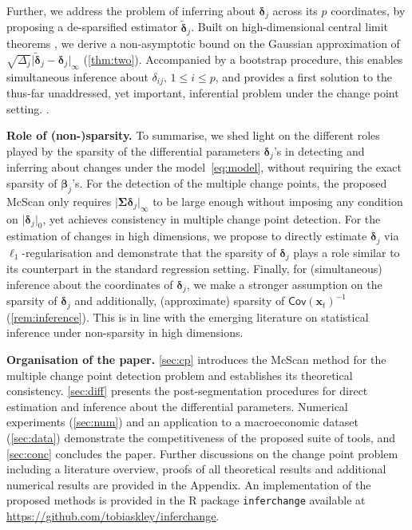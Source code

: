 \documentclass[11pt, a4paper]{article}
\newcommand{\mbf}{\mathbf}
\def\wc{\widetilde}
\newcommand{\Cov}[0]{\mathsf{Cov}}
\theoremstyle{definition}
\theoremstyle{definition}
\theoremstyle{definition}
\theoremstyle{definition}
\theoremstyle{definition}
\theoremstyle{remark}
\theoremstyle{definition}
\theoremstyle{definition}
\theoremstyle{definition}
\begin{document}
Further, we address the problem of inferring about $\bm\delta_j$ across its $p$ coordinates, by proposing a de-sparsified estimator $\wc{\bm\delta}_j$. Built on high-dimensional central limit theorems \citep{CCK23}, we derive a non-asymptotic bound on the Gaussian approximation of $\sqrt{\Delta_j} \vert \wc{\bm\delta}_j - \bm\delta_j \vert_\infty$ (\cref{thm:two}).
Accompanied by a bootstrap procedure, this enables simultaneous inference about $\delta_{ij}, \, 1 \le i \le p$, 
and provides a first solution to the thus-far unaddressed, yet important, inferential problem under the change point setting. . 

\smallskip
\textbf{Role of (non-)sparsity.} To summarise, we shed light on the different roles played by the sparsity of the differential parameters $\bm\delta_j$'s in detecting and inferring about changes under the model~\eqref{eq:model}, without requiring the exact sparsity of $\bm\beta_j$'s. For the detection of the multiple change points, the proposed McScan only requires $\vert \bm\Sigma \bm\delta_j \vert_\infty$ to be large enough without imposing any condition on $\vert \bm\delta_j \vert_0$, yet achieves consistency in multiple change point detection. 
For the estimation of changes in high dimensions, we propose to directly estimate $\bm\delta_j$ via $\ell_1$-regularisation and demonstrate that the sparsity of $\bm\delta_j$ plays a role similar to its counterpart in the standard regression setting.
Finally, for (simultaneous) inference about the coordinates of $\bm\delta_j$, we make a stronger assumption on the sparsity of $\bm\delta_j$ and additionally, (approximate) sparsity of $\Cov(\mbf x_t)^{-1}$ (\cref{rem:inference}). This is in line with the emerging literature on statistical inference under non-sparsity in high dimensions.

\smallskip
\textbf{Organisation of the paper.}
\cref{sec:cp} introduces the McScan method for the multiple change point detection problem and establishes its theoretical consistency. \cref{sec:diff} presents the post-segmentation procedures for direct estimation and inference about the differential parameters. Numerical experiments (\cref{sec:num}) and an application to a macroeconomic dataset (\cref{sec:data}) demonstrate the competitiveness of the proposed suite of tools, and \cref{sec:conc} concludes the paper. 
Further discussions on the change point problem including a literature overview, proofs of all theoretical results and additional numerical results are provided in the Appendix. An implementation of the proposed methods is provided in the R package \texttt{inferchange} available at \url{https://github.com/tobiaskley/inferchange}.
\end{document}
